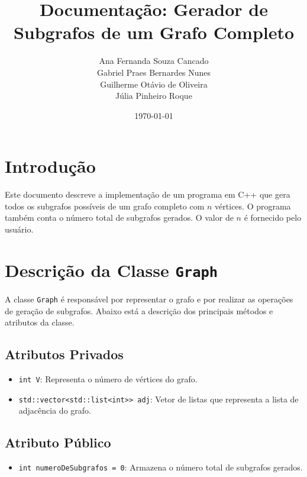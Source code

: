 \documentclass[a4paper,12pt]{article}
\title{Documentação: Gerador de Subgrafos de um Grafo Completo}
\author{Ana Fernanda Souza Cancado \\ Gabriel Praes Bernardes Nunes\\ Guilherme Otávio de Oliveira \\ Júlia Pinheiro Roque}
\date{\today}
\begin{document}
\maketitle

\section{Introdução}

Este documento descreve a implementação de um programa em C++ que gera todos os subgrafos possíveis de um grafo completo com $n$ vértices. O programa também conta o número total de subgrafos gerados. O valor de $n$ é fornecido pelo usuário.

\section{Descrição da Classe \texttt{Graph}}

A classe \texttt{Graph} é responsável por representar o grafo e por realizar as operações de geração de subgrafos. Abaixo está a descrição dos principais métodos e atributos da classe.

\subsection{Atributos Privados}
\begin{itemize}
    \item \texttt{int V}: Representa o número de vértices do grafo.
    \item \texttt{std::vector<std::list<int>> adj}: Vetor de listas que representa a lista de adjacência do grafo.
\end{itemize}

\subsection{Atributo Público}
\begin{itemize}
    \item \texttt{int numeroDeSubgrafos = 0}: Armazena o número total de subgrafos gerados.
\end{itemize}
\end{document}
